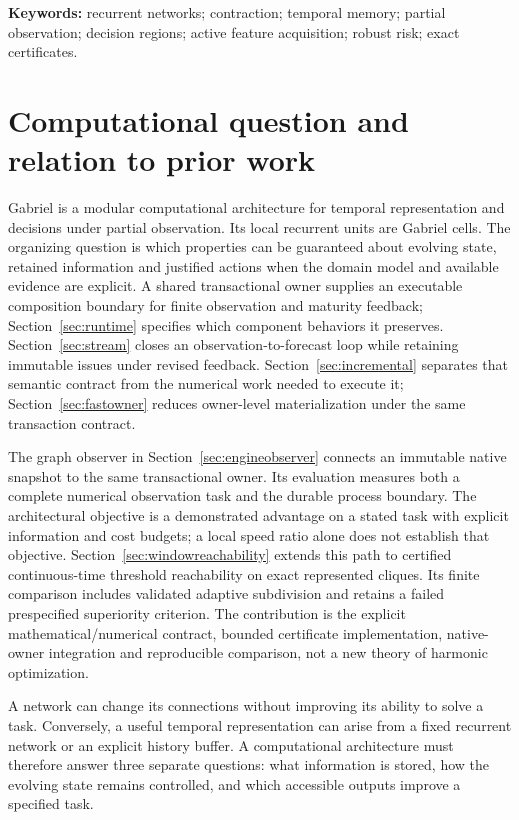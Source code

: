 \documentclass[11pt,a4paper]{article}
\theoremstyle{definition}\newtheorem{definition}[theorem]{Definition}
\begin{document}
{\small\textbf{Keywords:} recurrent networks; contraction; temporal memory; partial observation; decision regions; active feature acquisition; robust risk; exact certificates.}
\newpage
\begingroup
\footnotesize
\setcounter{tocdepth}{1}
\setlength{\parskip}{0pt}
\tableofcontents
\endgroup
\newpage

\section{Computational question and relation to prior work}
Gabriel is a modular computational architecture for temporal representation and decisions under partial observation. Its local recurrent units are Gabriel cells. The organizing question is which properties can be guaranteed about evolving state, retained information and justified actions when the domain model and available evidence are explicit. A shared transactional owner supplies an executable composition boundary for finite observation and maturity feedback; Section~\ref{sec:runtime} specifies which component behaviors it preserves. Section~\ref{sec:stream} closes an observation-to-forecast loop while retaining immutable issues under revised feedback. Section~\ref{sec:incremental} separates that semantic contract from the numerical work needed to execute it; Section~\ref{sec:fastowner} reduces owner-level materialization under the same transaction contract.

The graph observer in Section~\ref{sec:engineobserver} connects an immutable native snapshot to the same transactional owner. Its evaluation measures both a complete numerical observation task and the durable process boundary. The architectural objective is a demonstrated advantage on a stated task with explicit information and cost budgets; a local speed ratio alone does not establish that objective. Section~\ref{sec:windowreachability} extends this path to certified continuous-time threshold reachability on exact represented cliques. Its finite comparison includes validated adaptive subdivision and retains a failed prespecified superiority criterion. The contribution is the explicit mathematical/numerical contract, bounded certificate implementation, native-owner integration and reproducible comparison, not a new theory of harmonic optimization.

A network can change its connections without improving its ability to solve a task. Conversely, a useful temporal representation can arise from a fixed recurrent network or an explicit history buffer. A computational architecture must therefore answer three separate questions: what information is stored, how the evolving state remains controlled, and which accessible outputs improve a specified task.
\end{document}
